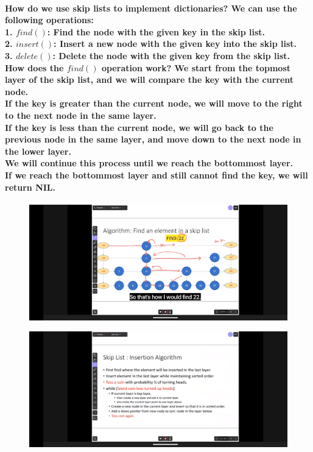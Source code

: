 \documentclass{article}
\begin{document}
\paragraph{
    How do we use skip lists to implement dictionaries?
    We can use the following operations:\\
    1. $find()$: Find the node with the given key in the skip list.\\
    2. $insert()$: Insert a new node with the given key into the skip list.\\
    3. $delete()$: Delete the node with the given key from the skip list.\\
    How does the $find()$ operation work?
    We start from the topmost layer of the skip list, and we will compare the key with the current node.\\
    If the key is greater than the current node, we will move to the right to the next node in the same layer.\\
    If the key is less than the current node, we will go back to the previous node in the same layer, and move down to the next node in the lower layer.\\
    We will continue this process until we reach the bottommost layer.\\
    If we reach the bottommost layer and still cannot find the key, we will return NIL.\\
}

\begin{figure}[H]
    \includegraphics[width=\textwidth]{skiplistfind22.png}
\end{figure}

\begin{figure}[H]
    \includegraphics[width=\textwidth]{skiplistinsertion.png}
\end{figure}
\end{document}
